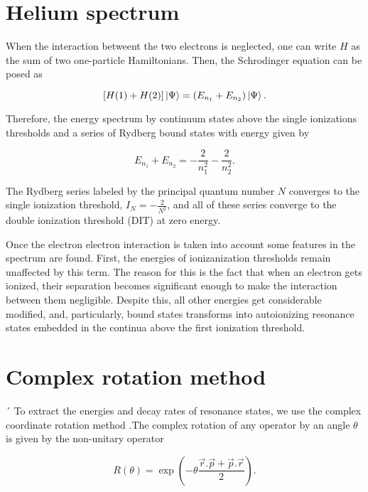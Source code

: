 \section{Helium spectrum}

When the interaction betweent the two electrons is neglected, one can write $ H $ as the sum of two one-particle Hamiltonians. Then, the Schrodinger equation can be posed as

\begin{equation}
	\left[ H(1) + H(2) \right] \ket{\Psi} = (E_{n_{1}}+ E_{n_{2}}) \ket{\Psi}.
\end{equation}

Therefore, the energy spectrum by continuum states above the single ionizations thresholds and a series of Rydberg bound states with energy given by

\begin{equation}
	E_{n_{1}}+ E_{n_{2}}=-\frac{2}{n_{1}^{2}}-\frac{2}{n_{2}^{2}}.
\end{equation}

The Rydberg series labeled by the principal quantum number $ N $ converges to the single ionization threshold, $ I_{N}=-\frac{2}{N^{2}} $, and all of these series converge to the double ionization threshold (DIT) at zero energy.

Once the electron electron interaction is taken into account some features in the spectrum are found. First, the energies of ionizanization thresholds remain unaffected by this term. The reason for this is the fact that when an electron gets ionized, their separation becomes significant enough to make the interaction between them negligible. Despite this, all other energies get considerable modified, and, particularly, bound states transforms into autoionizing resonance states embedded in the continua above the first ionization threshold.





\section{Complex rotation method} \label{complex} 
´
To extract the energies and decay rates of resonance states, we use the complex coordinate rotation method \cite{balslev1971spectral,ho1983method}.The complex rotation of any operator by an angle $ \theta $ is given by the non-unitary operator

\begin{equation}\label{key}
R(\theta)= \exp \left(-\theta \frac{\vec{r}.\vec{p}+\vec{p}.\vec{r}}{2}\right).
\end{equation}

